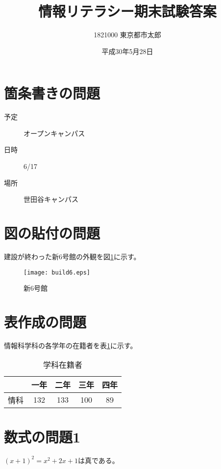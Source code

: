 \documentclass[10pt,a4j,twocolumn]{jarticle}
\title{情報リテラシー期末試験答案}
\author{1821000 東京都市太郎}
\date{平成30年5月28日}
\begin{document}
\maketitle

\section{箇条書きの問題}

\begin{description}
\item [予定] オープンキャンパス
\item [日時] 6/17
\item [場所] 世田谷キャンパス
\end{description}

\section{図の貼付の問題}

建設が終わった新6号館の外観を図\ref{fig:b6}に示す。

\begin{figure}[h]
\begin{center}
\texttt{[image: build6.eps]}
\end{center}
\caption{新6号館}
\label{fig:b6}
\end{figure}

\section{表作成の問題}

情報科学科の各学年の在籍者を表\ref{tb:cs}に示す。

\begin{table}[h]
\caption{学科在籍者}
\label{tb:cs}
\begin{center}
\begin{tabular}{|l|c|c|c|c|}
\hline
      &  一年  & 二年 & 三年 & 四年 \\ \hline  
情科  & 132    & 133  & 100  &  89 \\
\hline
\end{tabular}
\end{center}
\end{table}

\section{数式の問題1}

$(x+1)^2=x^2+2x+1$は真である。
\end{document}

